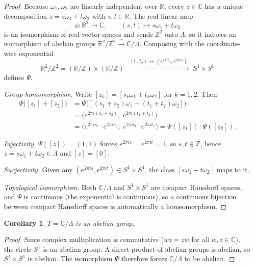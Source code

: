 \documentclass[11pt]{article}
\newcommand{\C}{\mathbb{C}}
\newcommand{\R}{\mathbb{R}}
\newcommand{\Z}{\mathbb{Z}}
\newtheorem*{corollary}{Corollary}
\begin{document}
\begin{proof}
Because \(\omega_1,\omega_2\) are linearly independent over \(\R\), every
\(z\in\C\) has a unique decomposition \(z=s\omega_1+t\omega_2\) with
\(s,t\in\R\).  The real-linear map
\[
\phi:\R^2\to\C,\qquad (s,t)\mapsto s\omega_1+t\omega_2
\]
is an isomorphism of real vector spaces and sends \(\Z^2\) onto
\(\Lambda\), so it induces an isomorphism of abelian groups
\(\R^2/\Z^2\xrightarrow{\;\sim\;}\C/\Lambda\).  Composing with the
coordinate-wise exponential
\[
\R^2/\Z^2 = (\R/\Z)\times(\R/\Z)
\;\xrightarrow{\;(t_1,t_2)\,\mapsto\,(e^{2\pi it_1},\,e^{2\pi it_2})\;}
\;S^1\times S^1
\]
defines \(\Psi\).

\noindent\textit{Group homomorphism.}\quad
Write \([z_k]=[s_k\omega_1+t_k\omega_2]\) for \(k=1,2\).  Then
\begin{align*}
\Psi\bigl([z_1]+[z_2]\bigr)
&= \Psi\bigl([(s_1{+}s_2)\omega_1+(t_1{+}t_2)\omega_2]\bigr)\\
&= \bigl(e^{2\pi i(s_1+s_2)},\;e^{2\pi i(t_1+t_2)}\bigr)\\
&= \bigl(e^{2\pi is_1}{\cdot}e^{2\pi is_2},\;
           e^{2\pi it_1}{\cdot}e^{2\pi it_2}\bigr)
 = \Psi([z_1])\cdot\Psi([z_2]).
\end{align*}

\noindent\textit{Injectivity.}\quad
\(\Psi([z])=(1,1)\) forces \(e^{2\pi is}=e^{2\pi it}=1\), so
\(s,t\in\Z\), hence \(z=s\omega_1+t\omega_2\in\Lambda\) and
\([z]=[0]\).

\noindent\textit{Surjectivity.}\quad
Given any \((e^{2\pi is},e^{2\pi it})\in S^1\times S^1\), the class
\([s\omega_1+t\omega_2]\) maps to it.

\noindent\textit{Topological isomorphism.}\quad
Both \(\C/\Lambda\) and \(S^1\times S^1\) are compact Hausdorff spaces,
and \(\Psi\) is continuous (the exponential is continuous), so a
continuous bijection between compact Hausdorff spaces is automatically a
homeomorphism.
\end{proof}

\begin{corollary}\label{cor:torus-abelian-s1}
\(T=\C/\Lambda\) is an abelian group.
\end{corollary}

\begin{proof}
Since complex multiplication is commutative (\(wz=zw\) for all
\(w,z\in\C\)), the circle \(S^1\) is an abelian group.  A direct product
of abelian groups is abelian, so \(S^1\times S^1\) is abelian.  The
isomorphism \(\Psi\) therefore forces \(\C/\Lambda\) to be abelian.
\end{proof}
\end{document}
